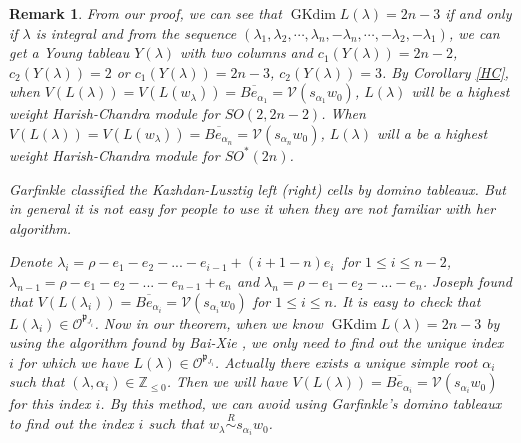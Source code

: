 \documentclass{amsart}[12pt]
\newtheorem{Rem}{Remark}[section]
\renewcommand{\subset}{\subseteq}
\newcommand{\gkd}{\operatorname{GKdim}}
\numberwithin{equation}{section}
\begin{document}
\begin{Rem}
From our proof, we can see that $\gkd L(\lambda)=2n-3$ if and only if $\lambda$ is integral and from the sequence
$
(\lambda_1,\lambda_2,\cdots,\lambda_n,-\lambda_n,\cdots,-\lambda_2,-\lambda_1)
$, we can get a Young tableau $Y(\lambda)$ with two columns and  $c_1(Y(\lambda))=2n-2$,  $c_2(Y(\lambda))=2$ or  $c_1(Y(\lambda))=2n-3$,  $c_2(Y(\lambda))=3$. By Corollary \ref{HC}, when $V(L(\lambda))=V(L(w_{\lambda}))=\overline{Be_{\alpha_1}}=\mathcal{V}(s_{\alpha_1}w_0)$, $L(\lambda)$ will be a highest weight Harish-Chandra module for $SO(2,2n-2)$. When $V(L(\lambda))=V(L(w_{\lambda}))=\overline{Be_{\alpha_n}}=\mathcal{V}(s_{\alpha_n}w_0)$, $L(\lambda)$ will a be a highest weight Harish-Chandra module for  $SO^*(2n)$.



Garfinkle \cite{Ga1,Ga2,Ga3} classified the Kazhdan-Lusztig left (right) cells by domino tableaux. But in general it is not easy for people to use it when they are not familiar with her algorithm.

Denote   $\lambda_i=\rho-e_1-e_2-...-e_{i-1}+(i+1-n)e_{i}~$ for $1\leq i\leq n-2$, $\lambda_{n-1}=\rho-e_1-e_2-...-e_{n-1}+e_{n}$ and $\lambda_{n}=\rho-e_1-e_2-...-e_{n}$. Joseph \cite{Jo98} found that  $V(L(\lambda_i))=\overline{Be_{\alpha_{i}}}=\mathcal{V}(s_{\alpha_i}w_0)$ for $1\leq i\leq n$. It is easy to check that $L(\lambda_i)\in \mathscr{O}^{\mathfrak{p}_{J_i}}$. Now in our theorem, when we know $\gkd L(\lambda)=2n-3$ by using the algorithm found by Bai-Xie \cite{BX-2}, we only need to find out the unique index $i$ for which we have $L(\lambda)\in \mathscr{O}^{\mathfrak{p}_{J_i}}$. Actually there exists a unique simple root $\alpha_i$ such that $(\lambda,\alpha_i)\in \mathbb{Z}_{\leq 0}$. Then we will have $V(L(\lambda))=\overline{Be_{\alpha_{i}}}=\mathcal{V}(s_{\alpha_i}w_0)$ for this index $i$. By this method, we can avoid using Garfinkle's domino tableaux to find out the index $i$ such that
$w_{\lambda}\stackrel{R}{\sim}s_{\alpha_{i}}w_0$.





\end{Rem}


%
%
%
\end{document}
